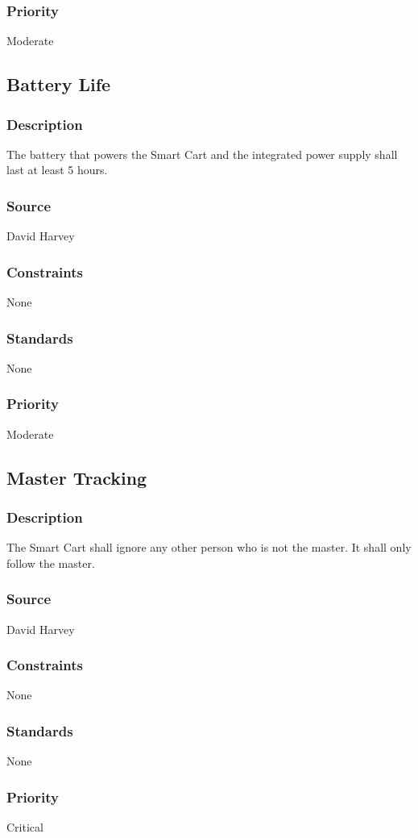\subsubsection{Priority}
Moderate

\subsection{Battery Life}
\subsubsection{Description}
The battery that powers the Smart Cart and the integrated power supply shall last at least 5 hours.
\subsubsection{Source}
David Harvey
\subsubsection{Constraints}
None
\subsubsection{Standards}
None
\subsubsection{Priority}
Moderate

\subsection{Master Tracking}
\subsubsection{Description}
The Smart Cart shall ignore any other person who is not the master. It shall only follow the master.
\subsubsection{Source}
David Harvey
\subsubsection{Constraints}
None
\subsubsection{Standards}
None
\subsubsection{Priority}
Critical

